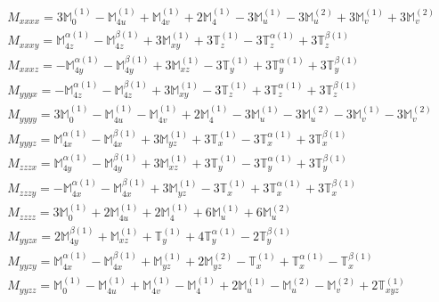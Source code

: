\documentclass[fleqn,8pt,landscape]{jsarticle}
\begin{document}
\begin{align*}
& M_{xxxx} = 3 \mathbb{M}_{0}^{(1)} - \mathbb{M}_{4u}^{(1)} + \mathbb{M}_{4v}^{(1)} + 2 \mathbb{M}_{4}^{(1)} - 3 \mathbb{M}_{u}^{(1)} - 3 \mathbb{M}_{u}^{(2)} + 3 \mathbb{M}_{v}^{(1)} + 3 \mathbb{M}_{v}^{(2)} \\
& M_{xxxy} = \mathbb{M}_{4z}^{\alpha(1)} - \mathbb{M}_{4z}^{\beta(1)} + 3 \mathbb{M}_{xy}^{(1)} + 3 \mathbb{T}_{z}^{(1)} - 3 \mathbb{T}_{z}^{\alpha(1)} + 3 \mathbb{T}_{z}^{\beta(1)} \\
& M_{xxxz} = - \mathbb{M}_{4y}^{\alpha(1)} - \mathbb{M}_{4y}^{\beta(1)} + 3 \mathbb{M}_{xz}^{(1)} - 3 \mathbb{T}_{y}^{(1)} + 3 \mathbb{T}_{y}^{\alpha(1)} + 3 \mathbb{T}_{y}^{\beta(1)} \\
& M_{yyyx} = - \mathbb{M}_{4z}^{\alpha(1)} - \mathbb{M}_{4z}^{\beta(1)} + 3 \mathbb{M}_{xy}^{(1)} - 3 \mathbb{T}_{z}^{(1)} + 3 \mathbb{T}_{z}^{\alpha(1)} + 3 \mathbb{T}_{z}^{\beta(1)} \\
& M_{yyyy} = 3 \mathbb{M}_{0}^{(1)} - \mathbb{M}_{4u}^{(1)} - \mathbb{M}_{4v}^{(1)} + 2 \mathbb{M}_{4}^{(1)} - 3 \mathbb{M}_{u}^{(1)} - 3 \mathbb{M}_{u}^{(2)} - 3 \mathbb{M}_{v}^{(1)} - 3 \mathbb{M}_{v}^{(2)} \\
& M_{yyyz} = \mathbb{M}_{4x}^{\alpha(1)} - \mathbb{M}_{4x}^{\beta(1)} + 3 \mathbb{M}_{yz}^{(1)} + 3 \mathbb{T}_{x}^{(1)} - 3 \mathbb{T}_{x}^{\alpha(1)} + 3 \mathbb{T}_{x}^{\beta(1)} \\
& M_{zzzx} = \mathbb{M}_{4y}^{\alpha(1)} - \mathbb{M}_{4y}^{\beta(1)} + 3 \mathbb{M}_{xz}^{(1)} + 3 \mathbb{T}_{y}^{(1)} - 3 \mathbb{T}_{y}^{\alpha(1)} + 3 \mathbb{T}_{y}^{\beta(1)} \\
& M_{zzzy} = - \mathbb{M}_{4x}^{\alpha(1)} - \mathbb{M}_{4x}^{\beta(1)} + 3 \mathbb{M}_{yz}^{(1)} - 3 \mathbb{T}_{x}^{(1)} + 3 \mathbb{T}_{x}^{\alpha(1)} + 3 \mathbb{T}_{x}^{\beta(1)} \\
& M_{zzzz} = 3 \mathbb{M}_{0}^{(1)} + 2 \mathbb{M}_{4u}^{(1)} + 2 \mathbb{M}_{4}^{(1)} + 6 \mathbb{M}_{u}^{(1)} + 6 \mathbb{M}_{u}^{(2)} \\
& M_{yyzx} = 2 \mathbb{M}_{4y}^{\beta(1)} + \mathbb{M}_{xz}^{(1)} + \mathbb{T}_{y}^{(1)} + 4 \mathbb{T}_{y}^{\alpha(1)} - 2 \mathbb{T}_{y}^{\beta(1)} \\
& M_{yyzy} = \mathbb{M}_{4x}^{\alpha(1)} - \mathbb{M}_{4x}^{\beta(1)} + \mathbb{M}_{yz}^{(1)} + 2 \mathbb{M}_{yz}^{(2)} - \mathbb{T}_{x}^{(1)} + \mathbb{T}_{x}^{\alpha(1)} - \mathbb{T}_{x}^{\beta(1)} \\
& M_{yyzz} = \mathbb{M}_{0}^{(1)} - \mathbb{M}_{4u}^{(1)} + \mathbb{M}_{4v}^{(1)} - \mathbb{M}_{4}^{(1)} + 2 \mathbb{M}_{u}^{(1)} - \mathbb{M}_{u}^{(2)} - \mathbb{M}_{v}^{(2)} + 2 \mathbb{T}_{xyz}^{(1)} \\

\end{align*}
\end{document}
